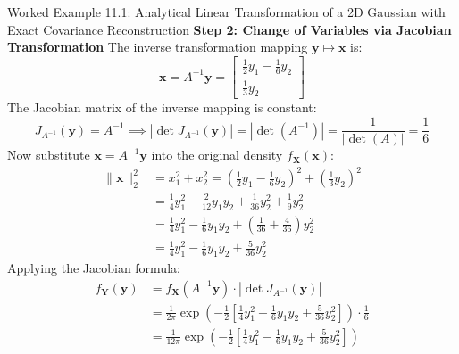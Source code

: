 \begin{examplebox}[breakable]{Worked Example 11.1: Analytical Linear Transformation of a 2D Gaussian with Exact Covariance Reconstruction}
\textbf{Step 2: Change of Variables via Jacobian Transformation}
The inverse transformation mapping $\mathbf{y} \mapsto \mathbf{x}$ is:
\begin{equation}
\mathbf{x} = A^{-1}\mathbf{y} = \begin{bmatrix} \frac{1}{2}y_1 - \frac{1}{6}y_2 \\ \frac{1}{3}y_2 \end{bmatrix}
\end{equation}
The Jacobian matrix of the inverse mapping is constant:
\begin{equation}
J_{A^{-1}}(\mathbf{y}) = A^{-1} \implies |\det J_{A^{-1}}(\mathbf{y})| = |\det(A^{-1})| = \frac{1}{|\det(A)|} = \frac{1}{6}
\end{equation}
Now substitute $\mathbf{x} = A^{-1}\mathbf{y}$ into the original density $f_{\mathbf{X}}(\mathbf{x})$:
\begin{align}
\|\mathbf{x}\|_2^2 &= x_1^2 + x_2^2 = \left( \frac{1}{2}y_1 - \frac{1}{6}y_2 \right)^2 + \left( \frac{1}{3}y_2 \right)^2 \nonumber \\
&= \frac{1}{4}y_1^2 - \frac{2}{12}y_1 y_2 + \frac{1}{36}y_2^2 + \frac{1}{9}y_2^2 \nonumber \\
&= \frac{1}{4}y_1^2 - \frac{1}{6}y_1 y_2 + \left( \frac{1}{36} + \frac{4}{36} \right)y_2^2 \nonumber \\
&= \frac{1}{4}y_1^2 - \frac{1}{6}y_1 y_2 + \frac{5}{36}y_2^2
\end{align}
Applying the Jacobian formula:
\begin{align}
f_{\mathbf{Y}}(\mathbf{y}) &= f_{\mathbf{X}}(A^{-1}\mathbf{y}) \cdot |\det J_{A^{-1}}(\mathbf{y})| \nonumber \\
&= \frac{1}{2\pi} \exp\left( -\frac{1}{2} \left[ \frac{1}{4}y_1^2 - \frac{1}{6}y_1 y_2 + \frac{5}{36}y_2^2 \right] \right) \cdot \frac{1}{6} \nonumber \\
&= \frac{1}{12\pi} \exp\left( -\frac{1}{2} \left[ \frac{1}{4}y_1^2 - \frac{1}{6}y_1 y_2 + \frac{5}{36}y_2^2 \right] \right)
\label{eq:ex_fy_derived}
\end{align}


\end{examplebox}
